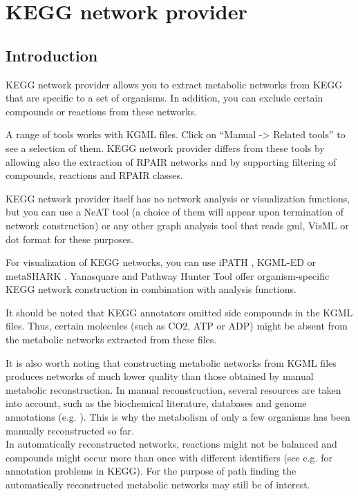 \chapter{KEGG network provider}

\section{Introduction}

KEGG network provider allows you to extract metabolic networks from KEGG \cite{Kanehisa2008} that are specific to a set of organisms.
In addition, you can exclude certain compounds or reactions from these networks.

A range of tools works with KGML files. Click on ``Manual -> Related tools'' to see a selection of them.
KEGG network provider differs from these tools by allowing also the extraction of RPAIR networks and by supporting
filtering of compounds, reactions and RPAIR classes.

KEGG network provider itself has no network analysis or visualization functions,
but you can use a NeAT tool (a choice of them will appear upon termination of network construction)
or any other graph analysis tool that reads gml, VisML or dot format for these purposes.

For visualization of KEGG networks, you can use iPATH \cite{ipath}, KGML-ED \cite{kgmled} or
metaSHARK \cite{metashark}.
Yanasquare \cite{yana} and Pathway Hunter Tool \cite{pht} offer
organism-specific KEGG network construction in combination
with analysis functions.

It should be noted that KEGG annotators omitted side compounds in the KGML files. Thus, certain molecules
(such as CO2, ATP or ADP) might be absent from the metabolic networks extracted from these files.

It is also worth noting that constructing metabolic networks from KGML files produces networks of much lower quality
than those obtained by manual metabolic reconstruction. In manual reconstruction, several resources are taken into account,
such as the biochemical literature, databases and genome annotations (e.g. \cite{Foerster2003}). This is why
the metabolism of only a few organisms has been manually reconstructed so far.\\
In automatically reconstructed networks, reactions might not be balanced and compounds might occur more
than once with different identifiers (see e.g. \cite{Poolman2006} for annotation problems in KEGG).
For the purpose of path finding the automatically reconstructed metabolic networks may still be of interest.

